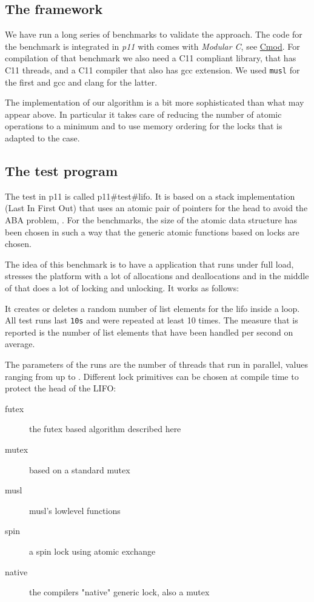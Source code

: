 \iflong%
\subsection{The framework}
\label{sec-4-1}

We have run a long series of benchmarks to validate the
approach. The code for the benchmark is integrated in \emph{p11} with
comes with \emph{Modular C}, see
\href{http://cmod.gforge.inria.fr}{Cmod}. For compilation of that
benchmark we also need a C11 compliant library, that has C11
threads, and a C11 compiler that also has gcc extension. We used
\texttt{musl} for the first and gcc and clang for the latter.

The implementation of our algorithm is a bit more sophisticated
than what may appear above. In particular it takes care of reducing
the number of atomic operations to a minimum and to use memory
ordering for the locks that is adapted to the case.

\subsection{The test program}
\label{sec-4-2}

The test in p11 is called p11\#test\#lifo. It is based on a stack
implementation (Last In First Out) that uses an atomic pair of
pointers for the head to avoid the ABA problem,
\cite{IBM370,michael04:aba}. For the benchmarks, the size of the atomic
data structure has been chosen in such a way that the generic
atomic functions based on locks are chosen.

The idea of this benchmark is to have a application that runs under
full load, stresses the platform with a lot of allocations and
deallocations and in the middle of that does a lot of locking and
unlocking. It works as follows:

It creates or deletes a random number of list elements for the lifo
inside a loop. All test runs last \texttt{10s} and were repeated at least
10 times. The measure that is reported is the number of list
elements that have been handled per second on average.

The parameters of the runs are the number of threads that run in
parallel, values ranging from  up to .  Different lock
primitives can be chosen at compile time to protect the head of the
LIFO:\itemadjust

\begin{description}
\item[{futex}] the futex based algorithm described here
\item[{mutex}] based on a standard mutex
\item[{musl}] musl's lowlevel  functions
\item[{spin}] a spin lock using atomic exchange
\item[{native}] the compilers "native" generic lock, also a mutex
\end{description}


